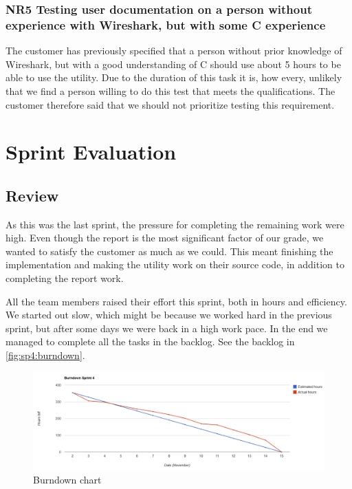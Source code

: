 \subsubsection{NR5 Testing user documentation on a person without experience with Wireshark, but with some C experience}
The customer has previously specified that a person without prior knowledge of Wireshark, but with a good understanding of C should use about 5 hours to be able to use the utility. Due to the duration of this task it is, how every, unlikely that we find a person willing to do this test that meets the qualifications. The customer therefore said that we should not prioritize testing this requirement.

\section{Sprint Evaluation}
\label{sec:sp4eval}
\subsection{Review}
As this was the last sprint, the pressure for completing the remaining work were high. Even though the report is the most significant factor of our grade, we wanted to satisfy the customer as much as we could. This meant finishing the implementation and making the utility work on their source code, in addition to completing the report work.

All the team members raised their effort this sprint, both in hours and efficiency. We started out slow, which might be because we worked hard in the previous sprint, but after some days we were back in a high work pace. In the end we managed to complete all the tasks in the backlog. See the backlog in  \autoref{fig:sp4:burndown}.

\begin{figure}[!htb]
	\includegraphics[width=\textwidth]{./sprints/img/burndown_chart_s4}
	\caption{Burndown chart\label{fig:sp4:burndown}}
\end{figure}

